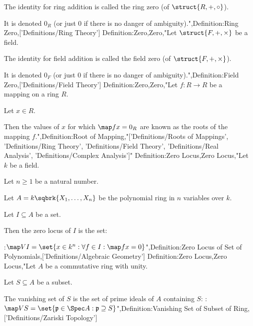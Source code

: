 The identity for ring addition is called the ring zero (of $\struct {R, +, \circ}$).


It is denoted $0_R$ (or just $0$ if there is no danger of ambiguity).",Definition:Ring Zero,['Definitions/Ring Theory']
Definition:Zero,Zero,"Let $\struct {F, +, \times}$ be a field.

The identity for field addition is called the field zero (of $\struct {F, +, \times}$).


It is denoted $0_F$ (or just $0$ if there is no danger of ambiguity).",Definition:Field Zero,['Definitions/Field Theory']
Definition:Zero,Zero,"Let $f: R \to R$ be a mapping on a ring $R$.

Let $x \in R$.


Then the values of $x$ for which $\map f x = 0_R$ are known as the roots of the mapping $f$.",Definition:Root of Mapping,"['Definitions/Roots of Mappings', 'Definitions/Ring Theory', 'Definitions/Field Theory', 'Definitions/Real Analysis', 'Definitions/Complex Analysis']"
Definition:Zero Locus,Zero Locus,"Let $k$ be a field.

Let $n\geq1$ be a natural number.

Let $A = k \sqbrk {X_1, \ldots, X_n}$ be the polynomial ring in $n$ variables over $k$.

Let $I \subseteq A$ be a set.


Then the zero locus of $I$ is the set:

:$\map V I = \set {x \in k^n : \forall f \in I: \map f x = 0}$",Definition:Zero Locus of Set of Polynomials,['Definitions/Algebraic Geometry']
Definition:Zero Locus,Zero Locus,"Let $A$ be a commutative ring with unity.

Let $S \subseteq A$ be a subset.


The vanishing set of $S$ is the set of prime ideals of $A$ containing $S$:
:$\map V S = \set {\mathfrak p \in \Spec A: \mathfrak p \supseteq S}$",Definition:Vanishing Set of Subset of Ring,['Definitions/Zariski Topology']
